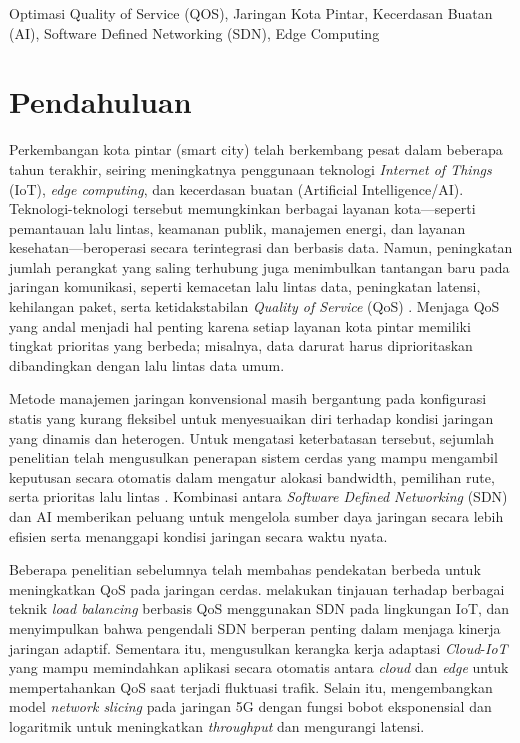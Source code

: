 \documentclass[a4paper,conference]{IEEEtran}
\begin{document}
\begin{IEEEkeywords}
Optimasi Quality of Service (QOS), Jaringan Kota Pintar, Kecerdasan Buatan (AI), Software Defined Networking (SDN), Edge Computing 
\end{IEEEkeywords}

\section{Pendahuluan}

Perkembangan kota pintar (smart city) telah berkembang pesat dalam beberapa tahun terakhir, seiring meningkatnya penggunaan teknologi \textit{Internet of Things} (IoT), \textit{edge computing}, dan kecerdasan buatan (Artificial Intelligence/AI). Teknologi-teknologi tersebut memungkinkan berbagai layanan kota—seperti pemantauan lalu lintas, keamanan publik, manajemen energi, dan layanan kesehatan—beroperasi secara terintegrasi dan berbasis data. Namun, peningkatan jumlah perangkat yang saling terhubung juga menimbulkan tantangan baru pada jaringan komunikasi, seperti kemacetan lalu lintas data, peningkatan latensi, kehilangan paket, serta ketidakstabilan \textit{Quality of Service} (QoS) \cite{ye2023}. Menjaga QoS yang andal menjadi hal penting karena setiap layanan kota pintar memiliki tingkat prioritas yang berbeda; misalnya, data darurat harus diprioritaskan dibandingkan dengan lalu lintas data umum.

Metode manajemen jaringan konvensional masih bergantung pada konfigurasi statis yang kurang fleksibel untuk menyesuaikan diri terhadap kondisi jaringan yang dinamis dan heterogen. Untuk mengatasi keterbatasan tersebut, sejumlah penelitian telah mengusulkan penerapan sistem cerdas yang mampu mengambil keputusan secara otomatis dalam mengatur alokasi bandwidth, pemilihan rute, serta prioritas lalu lintas \cite{li2023}. Kombinasi antara \textit{Software Defined Networking} (SDN) dan AI memberikan peluang untuk mengelola sumber daya jaringan secara lebih efisien serta menanggapi kondisi jaringan secara waktu nyata.

Beberapa penelitian sebelumnya telah membahas pendekatan berbeda untuk meningkatkan QoS pada jaringan cerdas. 
\cite{rostami2024} melakukan tinjauan terhadap berbagai teknik \textit{load balancing} berbasis QoS menggunakan SDN pada lingkungan IoT, dan menyimpulkan bahwa pengendali SDN berperan penting dalam menjaga kinerja jaringan adaptif. 
Sementara itu, \cite{herrera2023} mengusulkan kerangka kerja adaptasi \textit{Cloud}-\textit{IoT} yang mampu memindahkan aplikasi secara otomatis antara \textit{cloud} dan \textit{edge} untuk mempertahankan QoS saat terjadi fluktuasi trafik. 
Selain itu, \cite{nong2025} mengembangkan model \textit{network slicing} pada jaringan 5G dengan fungsi bobot eksponensial dan logaritmik untuk meningkatkan \textit{throughput} dan mengurangi latensi.
\end{document}
